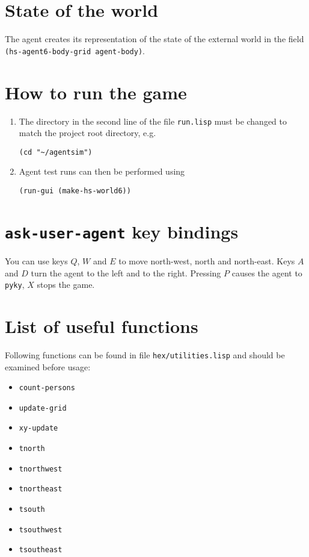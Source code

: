 \documentclass[a4paper,12pt]{article}
\begin{document}
\section*{State of the world}
The agent creates its representation of the state of the external world in the field \texttt{(hs-agent6-body-grid
agent-body)}.

\section*{How to run the game}
\begin{enumerate}
\item The directory in the second line of the file \texttt{run.lisp} must be changed to match the project root directory, e.g.
\begin{verbatim}
(cd "~/agentsim")
\end{verbatim}

\item Agent test runs can then be performed using

\begin{verbatim}
(run-gui (make-hs-world6))
\end{verbatim}

\end{enumerate}

\section*{\texttt{ask-user-agent} key bindings}
You can use keys $Q$, $W$ and $E$ to move north-west, north and north-east. Keys $A$ and $D$ turn
the agent to the left and to the right. Pressing $P$ causes the agent to \texttt{pyky}, $X$ stops the game.

\section*{List of useful functions}
Following functions can be found in file \texttt{hex/utilities.lisp} and should be examined before usage:
\begin{itemize}
\item \texttt{count-persons}
\item \texttt{update-grid}
\item \texttt{xy-update}
\item \texttt{tnorth}
\item \texttt{tnorthwest}
\item \texttt{tnortheast}
\item \texttt{tsouth}
\item \texttt{tsouthwest}
\item \texttt{tsoutheast}
\end{itemize}
\end{document}

